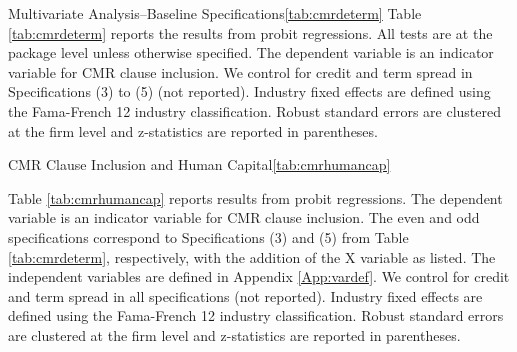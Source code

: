 \documentclass[a4paper,12pt]{article}
\begin{document}
\begin{singlespace}
\begin{papertable}{Multivariate Analysis--Baseline Specifications}{\ref{tab:cmrdeterm}}{}
    Table \ref{tab:cmrdeterm} reports the results from probit regressions. All tests are at the package level unless otherwise specified. The dependent variable is an indicator variable for CMR clause inclusion.
    We control for credit and term spread in Specifications (3) to (5) (not reported).
    Industry fixed effects are defined using the Fama-French 12 industry classification.
    Robust standard errors are clustered at the firm level and z-statistics are reported in parentheses.
    \postamble
    
    \startdata
    
\end{papertable}


\begin{papertable}{CMR Clause Inclusion and Human Capital}{\ref{tab:cmrhumancap}}{} \label{tab:cmrhumancap}
    
    Table \ref{tab:cmrhumancap} reports results from probit regressions.
    The dependent variable is an indicator variable for CMR clause inclusion.
    The even and odd specifications correspond to Specifications (3) and (5) from Table \ref{tab:cmrdeterm}, respectively, with the addition of the X variable as listed.
    The independent variables are defined in Appendix \ref{App:vardef}.
    We control for credit and term spread in all specifications (not reported).
    Industry fixed effects are defined using the Fama-French 12 industry classification.
    Robust standard errors are clustered at the firm level and z-statistics are reported in parentheses.
    \postamble
    

\end{papertable}
\end{singlespace}
\end{document}
